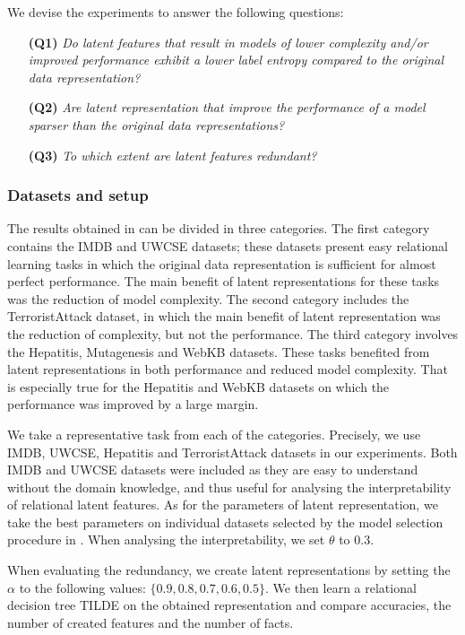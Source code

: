 We devise the experiments to answer the following questions:
\begin{itemize}
    \item[\textbf{(Q1)}] \textit{Do latent features that result in models of lower complexity and/or improved performance exhibit a lower label entropy compared to the original data representation?}
    \item[\textbf{(Q2)}] \textit{Are latent representation that improve the performance of a model sparser than the original data representations?}
    \item[\textbf{(Q3)}] \textit{To which extent are latent features redundant?}
\end{itemize}

\subsubsection{Datasets and setup}

The results  obtained in \cite{Dumancic2017} can be divided in three categories.
The first category contains the IMDB and UWCSE datasets; these datasets present easy relational learning tasks in which the original data representation is sufficient for almost perfect performance.
The main benefit of latent representations for these tasks was the reduction of model complexity.
The second category includes the TerroristAttack dataset, in which the main benefit of latent representation was the reduction of complexity, but not the performance.
The third category involves the Hepatitis, Mutagenesis and WebKB datasets.
These tasks benefited from latent representations in both performance and reduced model complexity.
That is especially true for the Hepatitis and WebKB datasets on which the performance was improved by a large margin.


We take a representative task from each of the categories.
Precisely, we use IMDB, UWCSE, Hepatitis and TerroristAttack datasets in our experiments.
Both IMDB and UWCSE datasets were included as they are easy to understand without the domain knowledge, and thus useful for analysing the interpretability of relational latent features.
As for the parameters of latent representation, we take the best parameters on individual datasets selected by the model selection procedure in \cite{Dumancic2017}.
When analysing the interpretability, we set $\theta$ to $0.3$.

When evaluating the redundancy, we create latent representations by setting the $\alpha$ to the following values: $\{0.9, 0.8, 0.7, 0.6, 0.5\}$.
We then learn a relational decision tree TILDE \cite{Blockeel1998285} on the obtained representation and compare accuracies, the number of created features and the number of facts.


